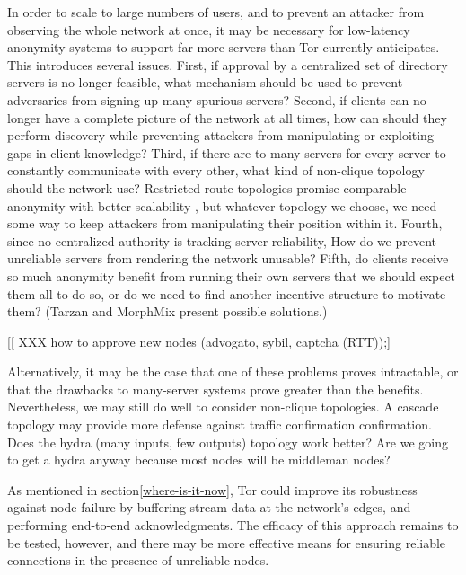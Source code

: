 \documentclass[times,10pt,twocolumn]{article}
\begin{document}
In order to scale to large numbers of users, and to prevent an
attacker from observing the whole network at once, it may be necessary
for low-latency anonymity systems to support far more servers than Tor
currently anticipates.  This introduces several issues.  First, if
approval by a centralized set of directory servers is no longer
feasible, what mechanism should be used to prevent adversaries from
signing up many spurious servers? 
Second, if clients can no longer have a complete
picture of the network at all times, how can should they perform
discovery while preventing attackers from manipulating or exploiting
gaps in client knowledge?  Third, if there are to many servers
for every server to constantly communicate with every other, what kind
of non-clique topology should the network use?   Restricted-route
topologies promise comparable anonymity with better scalability
\cite{danezis-pets03}, but whatever topology we choose, we need some
way to keep attackers from manipulating their position within it.
Fourth, since no centralized authority is tracking server reliability,
How do we prevent unreliable servers from rendering the network
unusable?  Fifth, do clients receive so much anonymity benefit from
running their own servers that we should expect them all to do so, or
do we need to find another incentive structure to motivate them?
(Tarzan and MorphMix present possible solutions.)

[[ XXX how to approve new nodes (advogato, sybil, captcha (RTT));]

Alternatively, it may be the case that one of these problems proves
intractable, or that the drawbacks to many-server systems prove
greater than the benefits.  Nevertheless, we may still do well to
consider non-clique topologies.  A cascade topology may provide more
defense against traffic confirmation confirmation.
Does the hydra (many inputs, few outputs) topology work
better? Are we going to get a hydra anyway because most nodes will be
middleman nodes?

%
As mentioned in section\ref{where-is-it-now}, Tor could improve its
robustness against node failure by buffering stream data at the
network's edges, and performing end-to-end acknowledgments.  The
efficacy of this approach remains to be tested, however, and there
may be more effective means for ensuring reliable connections in the
presence of unreliable nodes.
\end{document}
